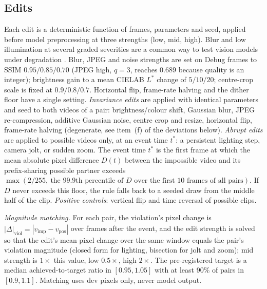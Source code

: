 \subsection{Edits}
Each edit is a deterministic function of frames, parameters and seed, applied before model preprocessing at three strengths (low, mid, high). Blur and low illumination at several graded severities are a common way to test vision models under degradation \cite{koushik2025,randieri2025}. Blur, JPEG and noise strengths are set on Debug frames to SSIM $0.95/0.85/0.70$ (JPEG high, $q=3$, reaches $0.689$ because quality is an integer); brightness gain to a mean CIELAB $L^*$ change of $5/10/20$; centre-crop scale is fixed at $0.9/0.8/0.7$. Horizontal flip, frame-rate halving and the dither floor have a single setting. \emph{Invariance edits} are applied with identical parameters and seed to both videos of a pair: brightness/colour shift, Gaussian blur, JPEG re-compression, additive Gaussian noise, centre crop and resize, horizontal flip, frame-rate halving (degenerate, see item~(f) of the deviations below). \emph{Abrupt edits} are applied to possible videos only, at an event time $t^*$: a persistent lighting step, camera jolt, or sudden zoom. The event time $t^*$ is the first frame at which the mean absolute pixel difference $D(t)$ between the impossible video and its prefix-sharing possible partner exceeds $\max(2/255,\ \text{the 99.9th percentile of } D \text{ over the first 10 frames of all pairs})$. If $D$ never exceeds this floor, the rule falls back to a seeded draw from the middle half of the clip. \emph{Positive controls}: vertical flip and time reversal of possible clips.

\emph{Magnitude matching.} For each pair, the violation's pixel change is $|\Delta|_{\mathrm{viol}}=\overline{|v_{\mathrm{imp}}-v_{\mathrm{pos}}|}$ over frames after the event, and the edit strength is solved so that the edit's mean pixel change over the same window equals the pair's violation magnitude (closed form for lighting, bisection for jolt and zoom); mid strength is $1\times$ this value, low $0.5\times$, high $2\times$. The pre-registered target is a median achieved-to-target ratio in $[0.95,1.05]$ with at least 90\% of pairs in $[0.9,1.1]$. Matching uses dev pixels only, never model output.

